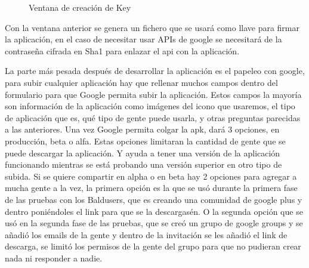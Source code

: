 \newpage
\begin{figure}[H] 
  \begin{center} 
    \caption{Ventana de creación de Key} 
    \label{fig:CreaciónKey} 
  \end{center} 
\end{figure}

Con la ventana anterior se genera un fichero que se usará como llave para firmar la aplicación, en el caso de necesitar usar APIs de google se necesitará de la contraseña cifrada en Sha1 para enlazar el api con la aplicación.


La parte más pesada después de desarrollar la aplicación es el papeleo con google, para subir cualquier aplicación hay que rellenar muchos campos dentro del formulario para que Google permita subir la aplicación. Estos campos la mayoría son información de la aplicación como imágenes del icono que usaremos, el tipo de aplicación que es, qué tipo de gente puede usarla, y otras preguntas parecidas a las anteriores.
Una vez Google permita colgar la apk, dará 3 opciones,  en producción, beta  o alfa. Estas opciones limitaran la cantidad de gente que se puede descargar la aplicación. Y ayuda a tener una versión de la aplicación funcionando mientras se está probando una versión superior en otro tipo de subida.
Si se quiere compartir en alpha o en beta hay 2 opciones para agregar a mucha gente a la vez, la primera opción es la que se usó durante la primera fase de las pruebas con los Baldusers, que es creando una comunidad de google plus y dentro poniéndoles el link para que se la descargasén. O la segunda opción que se usó en la segunda fase de las pruebas, que se creó un grupo de google groups y se añadió los emails de la gente y dentro de la invitación se les añadió el link de descarga, se limitó los permisos de la gente del grupo para que no pudieran crear nada ni responder a nadie.


